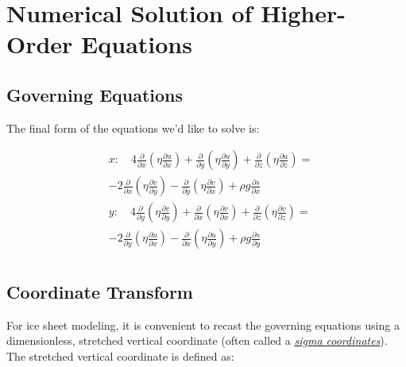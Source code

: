 %
%
%
%
%

\section{Numerical Solution of Higher-Order Equations}

\subsection{Governing Equations}
The final form of the equations we'd like to solve is:
 
\begin{align*}
 & x: \quad 4\frac{\partial }{\partial x}\left( \eta \frac{\partial u}{\partial x} \right)+\frac{\partial }{\partial y}\left( \eta \frac{\partial u}{\partial y} \right)+\frac{\partial }{\partial z}\left( \eta \frac{\partial u}{\partial z} \right)= \\
 &-2\frac{\partial }{\partial x}\left( \eta \frac{\partial v}{\partial y} \right)-\frac{\partial }{\partial y}\left( \eta \frac{\partial v}{\partial x} \right)+\rho g\frac{\partial s}{\partial x} \\ 
 & y: \quad 4\frac{\partial }{\partial y}\left( \eta \frac{\partial v}{\partial y} \right)+\frac{\partial }{\partial x}\left( \eta \frac{\partial v}{\partial x} \right)+\frac{\partial }{\partial z}\left( \eta \frac{\partial v}{\partial z} \right)= \\
 & -2\frac{\partial }{\partial y}\left( \eta \frac{\partial u}{\partial x} \right)-\frac{\partial }{\partial x}\left( \eta \frac{\partial u}{\partial y} \right)+\rho g\frac{\partial s}{\partial y} \\ 
\end{align*}

\subsection{Coordinate Transform}
For ice sheet modeling, it is convenient to recast the governing equations using a dimensionless, stretched vertical coordinate (often called a \href{http://atmo.tamu.edu/class/metr452/models/2001/vertres.html}{\textit{sigma coordinates}}). The stretched vertical coordinate is defined as:

